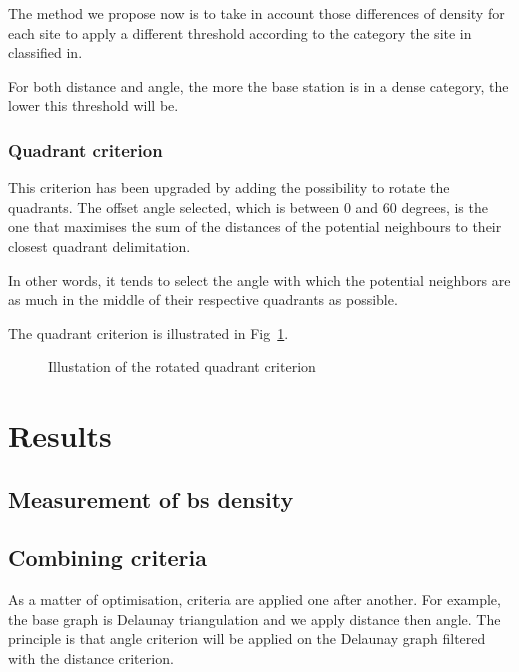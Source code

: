 \documentclass[lettersize,journal,english]{IEEEtran}
\begin{document}
The method we propose now is to take in account those differences of density for each site to apply a different threshold according to the category the site in classified in.

For both distance and angle, the more the base station is in a dense category, the lower this threshold will be.

\subsubsection{Quadrant criterion}
This criterion has been upgraded by adding the possibility to rotate the quadrants. The offset angle selected, which is between $0$ and 
$60$ degrees, is the one that maximises the sum of the distances of the potential neighbours to their closest quadrant delimitation.

In other words, it tends to select the angle with which the potential neighbors are as much in the middle of their respective quadrants
as possible.

The quadrant criterion is illustrated in Fig~\ref{fig:crit_qua}.
\begin{figure}
    \centering
    \caption{Illustation of the rotated quadrant criterion}
    \label{fig:crit_qua}
\end{figure}

\section{Results}

\subsection{Measurement of \acrshort{bs} density}

\subsection{Combining criteria}
As a matter of optimisation, criteria are applied one after another. For example, the base graph is Delaunay triangulation and we apply distance then angle.
The principle is that angle criterion will be applied on the Delaunay graph filtered with the distance criterion.
\end{document}
